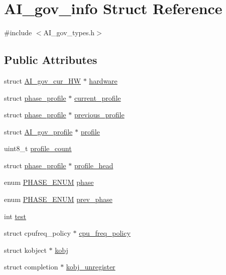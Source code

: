 \hypertarget{structAI__gov__info}{}\section{A\+I\+\_\+gov\+\_\+info Struct Reference}
\label{structAI__gov__info}


{\ttfamily \#include $<$A\+I\+\_\+gov\+\_\+types.\+h$>$}

\subsection*{Public Attributes}
\begin{DoxyCompactItemize}
\item 
struct \hyperlink{structAI__gov__cur__HW}{A\+I\+\_\+gov\+\_\+cur\+\_\+\+HW} $\ast$ \hyperlink{structAI__gov__info_a19aa2fc9d88145a9d27e30e2a4cdd3aa}{hardware}
\item 
struct \hyperlink{structphase__profile}{phase\+\_\+profile} $\ast$ \hyperlink{structAI__gov__info_a2bdc847cd8cc28498eb10ec414240cd1}{current\+\_\+profile}
\item 
struct \hyperlink{structphase__profile}{phase\+\_\+profile} $\ast$ \hyperlink{structAI__gov__info_a1c375041c5c2442159c9eba153639456}{previous\+\_\+profile}
\item 
struct \hyperlink{structAI__gov__profile}{A\+I\+\_\+gov\+\_\+profile} $\ast$ \hyperlink{structAI__gov__info_a2a844ed0f732488e81f7d66c6cec6cc4}{profile}
\item 
uint8\+\_\+t \hyperlink{structAI__gov__info_a0f2824df051724dda4bd5b10e80aa24d}{profile\+\_\+count}
\item 
struct \hyperlink{structphase__profile}{phase\+\_\+profile} $\ast$ \hyperlink{structAI__gov__info_a0030b57a8687673d1fdc807147dcb3cd}{profile\+\_\+head}
\item 
enum \hyperlink{AI__gov__phases_8h_a59664fef4d2987410ea13b917756d6ac}{P\+H\+A\+S\+E\+\_\+\+E\+N\+UM} \hyperlink{structAI__gov__info_a545f98903d56069b6291b4de3dc52811}{phase}
\item 
enum \hyperlink{AI__gov__phases_8h_a59664fef4d2987410ea13b917756d6ac}{P\+H\+A\+S\+E\+\_\+\+E\+N\+UM} \hyperlink{structAI__gov__info_ac0a5c22a5dad5650c971c7127ce03687}{prev\+\_\+phase}
\item 
int \hyperlink{structAI__gov__info_ae8234703260a2e03aa8d0ff58a4451f1}{test}
\item 
struct cpufreq\+\_\+policy $\ast$ \hyperlink{structAI__gov__info_a27175daa0e6c1cf7ac0f3c006ac26d91}{cpu\+\_\+freq\+\_\+policy}
\item 
struct kobject $\ast$ \hyperlink{structAI__gov__info_a7311e0f47b502f0aef667416ee3beed2}{kobj}
\item 
struct completion $\ast$ \hyperlink{structAI__gov__info_a1f3332ee18a59f9ce516265f19a44c48}{kobj\+\_\+unregister}
\end{DoxyCompactItemize}


